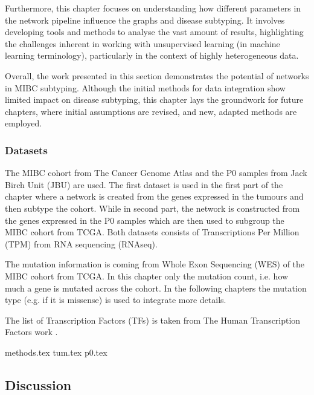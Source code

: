 Furthermore, this chapter focuses on understanding how different parameters in the network pipeline influence the graphs and disease subtyping. It involves developing tools and methods to analyse the vast amount of results, highlighting the challenges inherent in working with unsupervised learning (in machine learning terminology), particularly in the context of highly heterogeneous data.

Overall, the work presented in this section demonstrates the potential of networks in MIBC subtyping. Although the initial methods for data integration show limited impact on disease subtyping, this chapter lays the groundwork for future chapters, where initial assumptions are revised, and new, adapted methods are employed.

\subsubsection{Datasets}

The MIBC cohort from The Cancer Genome Atlas \cite{Robertson2017-mg} and the P0 samples from Jack Birch Unit (JBU) are used. The first dataset is used in the first part of the chapter where a network is created from the genes expressed in the tumours and then subtype the cohort. While in second part, the network is constructed from the genes expressed in the P0 samples which are then used to subgroup the MIBC cohort from TCGA. Both datasets consists of Transcriptions Per Million (TPM) from RNA sequencing (RNAseq). 

The mutation information is coming from Whole Exon Sequencing (WES) of the MIBC cohort from TCGA. In this chapter only the mutation count, i.e. how much a gene is mutated across the cohort. In the following chapters the mutation type (e.g. if it is missense) is used to integrate more details.

The list of Transcription Factors (TFs) is taken from The Human Transcription Factors work \citet{Lambert2018-el}.





{methods.tex}
\newpage
{tum.tex}
\newpage
{p0.tex}
\newpage

\subsection{Discussion}

